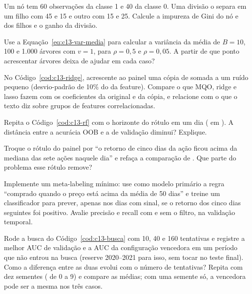 \begin{exercicios}
  \item {} Um nó tem 60 observações da classe 1 e 40 da classe 0. Uma divisão o separa em um filho com 45 e 15 e outro com 15 e 25. Calcule a impureza de Gini do nó e dos filhos e o ganho da divisão.
  \item {} Use a Equação~\eqref{eq:c13-var-media} para calcular a variância da média de $B = 10$, 100 e 1.000 árvores com $v = 1$, para $\rho = 0,5$ e $\rho = 0,05$. A partir de que ponto acrescentar árvores deixa de ajudar em cada caso?
  \item {} No Código~\ref{cod:c13-ridge}, acrescente ao painel uma cópia de  somada a um ruído pequeno (desvio-padrão de 10\% do da feature). Compare o que MQO, ridge e lasso fazem com os coeficientes da original e da cópia, e relacione com o que o texto diz sobre grupos de features correlacionadas.
  \item {} Repita o Código~\ref{cod:c13-rf} com o horizonte do rótulo em um dia ( em ). A distância entre a acurácia OOB e a de validação diminui? Explique.
  \item {} Troque o rótulo do painel por ``o retorno de cinco dias da ação ficou acima da mediana das sete ações naquele dia'' e refaça a comparação de . Que parte do problema esse rótulo remove?
  \item {} Implemente um meta-labeling mínimo: use como modelo primário a regra ``comprado quando o preço está acima da média de 50 dias'' e treine um classificador para prever, apenas nos dias com sinal, se o retorno dos cinco dias seguintes foi positivo. Avalie precisão e recall com e sem o filtro, na validação temporal.
  \item {} Rode a busca do Código~\ref{cod:c13-busca} com 10, 40 e 160 tentativas e registre a melhor AUC de validação e a AUC da configuração vencedora em um período que não entrou na busca (reserve 2020--2021 para isso, sem tocar no teste final). Como a diferença entre as duas evolui com o número de tentativas? Repita com dez sementes ( de 0 a 9) e compare as médias; com uma semente só, a vencedora pode ser a mesma nos três casos.
\end{exercicios}

